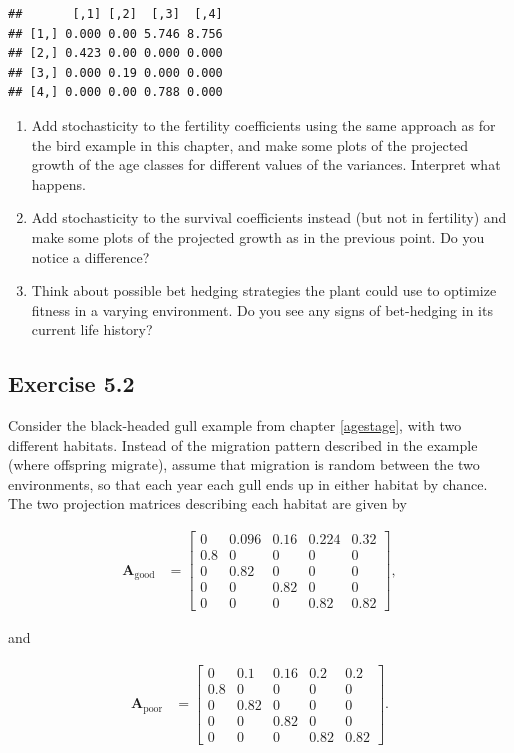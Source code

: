 \documentclass[
]{book}
\begin{document}
\begin{verbatim}
##       [,1] [,2]  [,3]  [,4]
## [1,] 0.000 0.00 5.746 8.756
## [2,] 0.423 0.00 0.000 0.000
## [3,] 0.000 0.19 0.000 0.000
## [4,] 0.000 0.00 0.788 0.000
\end{verbatim}

\begin{enumerate}
\def\labelenumi{\arabic{enumi}.}
\item
  Add stochasticity to the fertility coefficients using the same approach as for the bird example in this chapter, and make some plots of the projected growth of the age classes for different values of the variances. Interpret what happens.
\item
  Add stochasticity to the survival coefficients instead (but not in fertility) and make some plots of the projected growth as in the previous point. Do you notice a difference?
\item
  Think about possible bet hedging strategies the plant could use to optimize fitness in a varying environment. Do you see any signs of bet-hedging in its current life history?
\end{enumerate}

\hypertarget{exercise-5.2}{%
\subsection*{Exercise 5.2}\label{exercise-5.2}}

Consider the black-headed gull example from chapter \ref{agestage}, with two different habitats. Instead of the migration pattern described in the example (where offspring migrate), assume that migration is random between the two environments, so that each year each gull ends up in either habitat by chance. The two projection matrices describing each habitat are given by

\begin{align*}
\mathbf{A}_{\text{good}}
&=\left[\begin{matrix}
0&0.096& 0.16&0.224&0.32\\
0.8&0& 0& 0&0\\
0&0.82& 0& 0&0\\
0&0& 0.82& 0&0\\
0&0& 0& 0.82&0.82
\end{matrix}\right],
\end{align*}

and

\begin{align*}
\mathbf{A}_{\text{poor}}
&=\left[\begin{matrix}
0&0.1& 0.16&0.2&0.2\\
0.8&0& 0& 0&0\\
0&0.82& 0& 0&0\\
0&0& 0.82& 0&0\\
0&0& 0& 0.82&0.82
\end{matrix}\right].
\end{align*}
\end{document}
